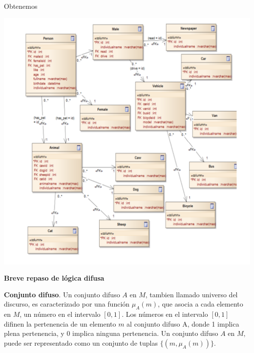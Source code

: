 \documentclass{fancyslides}
\begin{document}
\begin{frame}
\misc
{

\justifying Obtenemos

\begin{center}
\includegraphics[scale=0.15]{owl2dw}
\end{center}

}
\end{frame}


\begin{frame}
\end{frame}

\begin{frame}
\misc
{ \textbf{Breve repaso de lógica difusa}
\newline

\justifying \textbf{Conjunto difuso}. Un conjunto difuso $A$ en $M$, tambien llamado universo del discurso, es caracterizado por una función
$\mu_{A}(m)$, que asocia a cada elemento en $M$, un número en el intervalo $[0,1]$. Los números en el intervalo $[0,1]$ difinen la pertenencia
de un elemento $m$ al conjunto difuso A, donde 1 implica plena pertenencia, y 0 implica ninguna pertenencia.
Un conjunto difuso $A$ en $M$, puede ser representado como un conjunto de tuplas $\{ (m, \mu_{A}(m))\}$.

}
\end{frame}
\end{document}
